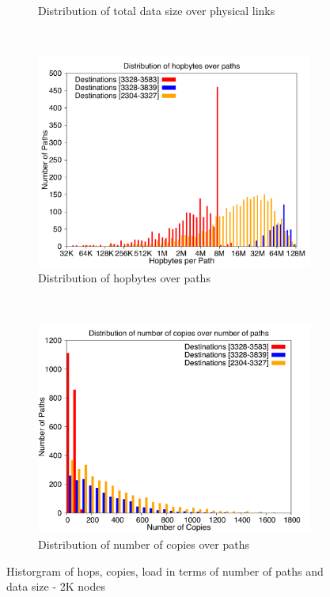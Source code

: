 \begin{figure}[!htbp]
\begin{subfigure}[b]{0.49\textwidth}
                \caption{Distribution of total data size over physical links}
                \label{fig:incrsize_4k_loaddata}
        \end{subfigure}
        ~ %
        \begin{subfigure}[b]{0.49\textwidth}
                \includegraphics[width=\textwidth]{report_figures/incrsize/4k/hopbyte_histo.pdf}
                \caption{Distribution of hopbytes over paths}
                \label{fig:incrsize_4k_hopbyte}
        \end{subfigure}
        ~ %
        \begin{subfigure}[b]{0.49\textwidth}
                \includegraphics[width=\textwidth]{report_figures/incrsize/4k/hopcopy_histo.pdf}
                \caption{Distribution of number of copies over paths}
                \label{fig:incrsize_4k_hopcopy}
        \end{subfigure}
        \caption{Historgram of hops, copies, load in terms of number of paths and data size - 2K nodes}
        \label{fig:incrsize_4k_histo}
\end{figure}
